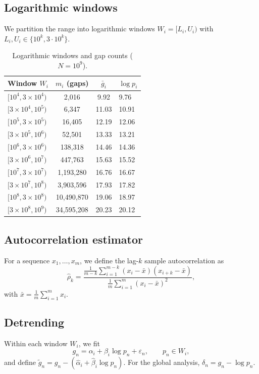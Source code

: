 \documentclass[11pt]{article}
\begin{document}
\subsection{Logarithmic windows}
We partition the range into logarithmic windows
$W_i = [L_i, U_i)$ with $L_i, U_i \in \{10^k, 3\cdot 10^k\}$.

\begin{table}[H]\centering
\caption{Logarithmic windows and gap counts ($N = 10^9$).}
\label{tab:windows}
\begin{tabular}{lccl}
\toprule
Window $W_i$ & $m_i$ (gaps) & $\bar g_i$ & $\log p_i$ \\
\midrule
$[10^4, 3\times10^4)$         & 2,016     & 9.92  & 9.76  \\
$[3\times10^4, 10^5)$         & 6,347     & 11.03 & 10.91 \\
$[10^5, 3\times10^5)$         & 16,405    & 12.19 & 12.06 \\
$[3\times10^5, 10^6)$         & 52,501    & 13.33 & 13.21 \\
$[10^6, 3\times10^6)$         & 138,318   & 14.46 & 14.36 \\
$[3\times10^6, 10^7)$         & 447,763   & 15.63 & 15.52 \\
$[10^7, 3\times10^7)$         & 1,193,280 & 16.76 & 16.67 \\
$[3\times10^7, 10^8)$         & 3,903,596 & 17.93 & 17.82 \\
$[10^8, 3\times10^8)$         & 10,490,870 & 19.06 & 18.97 \\
$[3\times10^8, 10^9)$         & 34,595,208 & 20.23 & 20.12 \\
\bottomrule
\end{tabular}
\end{table}

\subsection{Autocorrelation estimator}
For a sequence $x_1, \ldots, x_m$, we define the lag-$k$ sample
autocorrelation as
\begin{equation}
\hat\rho_k =
\frac{\frac{1}{m-k}\sum_{i=1}^{m-k}(x_i - \bar x)(x_{i+k} - \bar x)}
     {\frac{1}{m}\sum_{i=1}^{m}(x_i - \bar x)^2},
\end{equation}
with $\bar x = \frac{1}{m}\sum_{i=1}^{m}x_i$.

\subsection{Detrending}
Within each window $W_i$, we fit
\begin{equation}
g_n = \alpha_i + \beta_i \log p_n + \varepsilon_n, \qquad p_n \in W_i,
\end{equation}
and define $\tilde g_n = g_n - (\hat\alpha_i + \hat\beta_i \log p_n)$.
For the global analysis, $\delta_n = g_n - \log p_n$.
\end{document}
